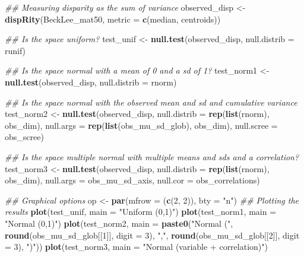 \documentclass[
]{book}
\newenvironment{Shaded}{\begin{snugshade}}{\end{snugshade}}
\newcommand{\CommentTok}[1]{\textcolor[rgb]{0.56,0.35,0.01}{\textit{#1}}}
\newcommand{\DataTypeTok}[1]{\textcolor[rgb]{0.13,0.29,0.53}{#1}}
\newcommand{\DecValTok}[1]{\textcolor[rgb]{0.00,0.00,0.81}{#1}}
\newcommand{\KeywordTok}[1]{\textcolor[rgb]{0.13,0.29,0.53}{\textbf{#1}}}
\newcommand{\NormalTok}[1]{#1}
\newcommand{\StringTok}[1]{\textcolor[rgb]{0.31,0.60,0.02}{#1}}
\begin{document}
\begin{Shaded}
\begin{Highlighting}[]
\CommentTok{\#\# Measuring disparity as the sum of variance}
\NormalTok{observed\_disp \textless{}{-}}\StringTok{ }\KeywordTok{dispRity}\NormalTok{(BeckLee\_mat50, }\DataTypeTok{metric =} \KeywordTok{c}\NormalTok{(median, centroids))}

\CommentTok{\#\# Is the space uniform?}
\NormalTok{test\_unif \textless{}{-}}\StringTok{ }\KeywordTok{null.test}\NormalTok{(observed\_disp, }\DataTypeTok{null.distrib =}\NormalTok{ runif)}

\CommentTok{\#\# Is the space normal with a mean of 0 and a sd of 1?}
\NormalTok{test\_norm1 \textless{}{-}}\StringTok{ }\KeywordTok{null.test}\NormalTok{(observed\_disp, }\DataTypeTok{null.distrib =}\NormalTok{ rnorm)}

\CommentTok{\#\# Is the space normal with the observed mean and sd and cumulative variance}
\NormalTok{test\_norm2 \textless{}{-}}\StringTok{ }\KeywordTok{null.test}\NormalTok{(observed\_disp, }\DataTypeTok{null.distrib =} \KeywordTok{rep}\NormalTok{(}\KeywordTok{list}\NormalTok{(rnorm), obs\_dim),}
                        \DataTypeTok{null.args =} \KeywordTok{rep}\NormalTok{(}\KeywordTok{list}\NormalTok{(obs\_mu\_sd\_glob), obs\_dim),}
                        \DataTypeTok{null.scree =}\NormalTok{ obs\_scree)}

\CommentTok{\#\# Is the space multiple normal with multiple means and sds and a correlation?}
\NormalTok{test\_norm3 \textless{}{-}}\StringTok{ }\KeywordTok{null.test}\NormalTok{(observed\_disp, }\DataTypeTok{null.distrib =} \KeywordTok{rep}\NormalTok{(}\KeywordTok{list}\NormalTok{(rnorm), obs\_dim),}
                        \DataTypeTok{null.args =}\NormalTok{ obs\_mu\_sd\_axis, }\DataTypeTok{null.cor =}\NormalTok{ obs\_correlations)}

\CommentTok{\#\# Graphical options}
\NormalTok{op \textless{}{-}}\StringTok{ }\KeywordTok{par}\NormalTok{(}\DataTypeTok{mfrow =}\NormalTok{ (}\KeywordTok{c}\NormalTok{(}\DecValTok{2}\NormalTok{, }\DecValTok{2}\NormalTok{)), }\DataTypeTok{bty =} \StringTok{"n"}\NormalTok{)}
\CommentTok{\#\# Plotting the results}
\KeywordTok{plot}\NormalTok{(test\_unif, }\DataTypeTok{main =} \StringTok{"Uniform (0,1)"}\NormalTok{)}
\KeywordTok{plot}\NormalTok{(test\_norm1, }\DataTypeTok{main =} \StringTok{"Normal (0,1)"}\NormalTok{)}
\KeywordTok{plot}\NormalTok{(test\_norm2, }\DataTypeTok{main =} \KeywordTok{paste0}\NormalTok{(}\StringTok{"Normal ("}\NormalTok{, }\KeywordTok{round}\NormalTok{(obs\_mu\_sd\_glob[[}\DecValTok{1}\NormalTok{]], }\DataTypeTok{digit =} \DecValTok{3}\NormalTok{),}
                              \StringTok{","}\NormalTok{, }\KeywordTok{round}\NormalTok{(obs\_mu\_sd\_glob[[}\DecValTok{2}\NormalTok{]], }\DataTypeTok{digit =} \DecValTok{3}\NormalTok{), }\StringTok{")"}\NormalTok{))}
\KeywordTok{plot}\NormalTok{(test\_norm3, }\DataTypeTok{main =} \StringTok{"Normal (variable + correlation)"}\NormalTok{)}
\end{Highlighting}
\end{Shaded}
\end{document}
